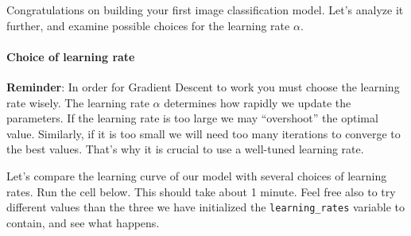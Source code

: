\documentclass[11pt]{article}
\begin{document}
Congratulations on building your first image classification model. Let's
analyze it further, and examine possible choices for the learning rate
\(\alpha\).

    \hypertarget{choice-of-learning-rate}{%
\paragraph{Choice of learning rate}\label{choice-of-learning-rate}}

\textbf{Reminder}: In order for Gradient Descent to work you must choose
the learning rate wisely. The learning rate \(\alpha\) determines how
rapidly we update the parameters. If the learning rate is too large we
may ``overshoot'' the optimal value. Similarly, if it is too small we
will need too many iterations to converge to the best values. That's why
it is crucial to use a well-tuned learning rate.

Let's compare the learning curve of our model with several choices of
learning rates. Run the cell below. This should take about 1 minute.
Feel free also to try different values than the three we have
initialized the \texttt{learning\_rates} variable to contain, and see
what happens.
\end{document}
